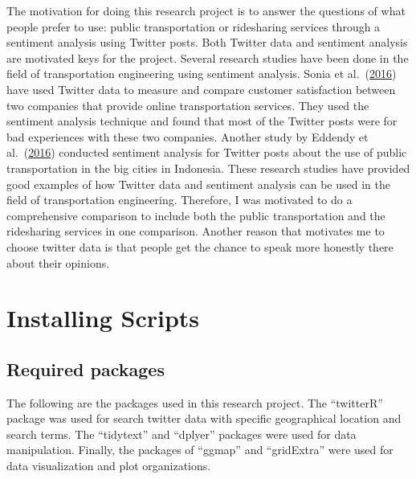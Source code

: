 \documentclass[
  12pt,
]{article}
\begin{document}
The motivation for doing this research project is to answer the
questions of what people prefer to use: public transportation or
ridesharing services through a sentiment analysis using Twitter posts.
Both Twitter data and sentiment analysis are motivated keys for the
project. Several research studies have been done in the field of
transportation engineering using sentiment analysis. Sonia et
al.~(\protect\hyperlink{ref-Sonia16}{2016}) have used Twitter data to
measure and compare customer satisfaction between two companies that
provide online transportation services. They used the sentiment analysis
technique and found that most of the Twitter posts were for bad
experiences with these two companies. Another study by Eddendy et
al.~(\protect\hyperlink{ref-Effendy16}{2016}) conducted sentiment
analysis for Twitter posts about the use of public transportation in the
big cities in Indonesia. These research studies have provided good
examples of how Twitter data and sentiment analysis can be used in the
field of transportation engineering. Therefore, I was motivated to do a
comprehensive comparison to include both the public transportation and
the ridesharing services in one comparison. Another reason that
motivates me to choose twitter data is that people get the chance to
speak more honestly there about their opinions.

\hypertarget{installing-scripts}{%
\section{Installing Scripts}\label{installing-scripts}}

\hypertarget{required-packages}{%
\subsection{Required packages}\label{required-packages}}

The following are the packages used in this research project. The
``twitterR'' package was used for search twitter data with specific
geographical location and search terms. The ``tidytext'' and ``dplyer''
packages were used for data manipulation. Finally, the packages of
``ggmap'' and ``gridExtra'' were used for data visualization and plot
organizations.
\end{document}
